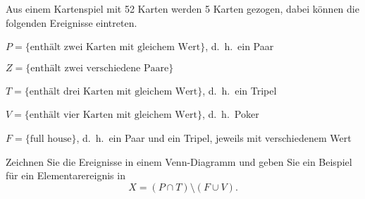 Aus einem Kartenspiel mit 52 Karten werden 5 Karten gezogen, dabei
können die folgenden Ereignisse eintreten.
\begin{teilaufgaben}
\item
$P=\{\text{enthält zwei Karten mit gleichem Wert}\}$, d.~h.~ein Paar
\item
$Z=\{\text{enthält zwei verschiedene Paare}\}$
\item
$T=\{\text{enthält drei Karten mit gleichem Wert}\}$, d.~h.~ein Tripel
\item
$V=\{\text{enthält vier Karten mit gleichem Wert}\}$, d.~h.~Poker
\item
$F=\{\text{full house}\}$, d.~h.~ein Paar und ein Tripel, jeweils mit
verschiedenem Wert
\end{teilaufgaben}
Zeichnen Sie die Ereignisse in einem Venn-Diagramm und geben Sie
ein Beispiel für ein Elementarereignis in
\[
X
=
(P\cap T)\setminus(F\cup V)
.
\]

